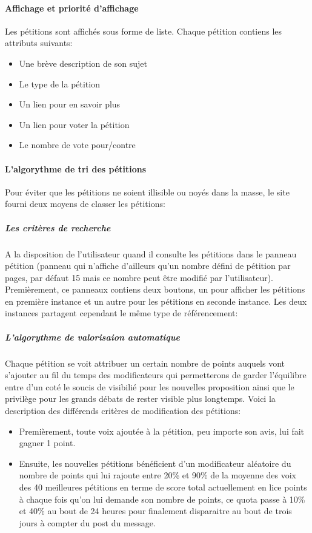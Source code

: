 \documentclass[a4paper,12pt]{article}
\begin{document}
\paragraph{Affichage et priorité d'affichage}
Les pétitions sont affichés sous forme de liste. Chaque pétition contiens les attributs suivants:
\begin{itemize}
 \item Une brève description de son sujet
 \item Le type de la pétition
 \item Un lien pour en savoir plus
 \item Un lien pour voter la pétition
 \item Le nombre de vote pour/contre
\end{itemize}
\paragraph{L'algorythme de tri des pétitions}
Pour éviter que les pétitions ne soient illisible ou noyés dans la masse, le site fourni deux moyens de classer les pétitions:
\subparagraph{Les critères de recherche}
A la disposition de l'utilisateur quand il consulte les pétitions dans le panneau pétition (panneau qui n'affiche d'ailleurs qu'un nombre défini de pétition par pages, par défaut 15 mais ce nombre peut être modifié par l'utilisateur). Premièrement, ce panneaux contiens deux boutons, un pour afficher les pétitions en première instance et un autre pour les pétitions en seconde instance. Les deux instances partagent cependant le même type de référencement:
\subparagraph{L'algorythme de valorisaion automatique}
Chaque pétition se voit attribuer un certain nombre de points auquels vont s'ajouter au fil du temps des modificateurs qui permetterons de garder l'équilibre entre d'un coté le soucis de visibilié pour les nouvelles proposition ainsi que le privilège pour les grands débats de rester visible plus longtemps. Voici la description des différends critères de modification des pétitions:
\begin{itemize}
 \item Premièrement, toute voix ajoutée à la pétition, peu importe son avis, lui fait gagner 1 point.
 \item Ensuite, les nouvelles pétitions bénéficient d'un modificateur aléatoire du nombre de points qui lui rajoute entre 20\% et 90\% de la moyenne des voix des 40 meilleures pétitions en terme de score total actuellement en lice points à chaque fois qu'on lui demande son nombre de points, ce quota passe à 10\% et 40\% au bout de 24 heures pour finalement disparaitre au bout de trois jours à compter du post du message.
\end{itemize}
\end{document}
